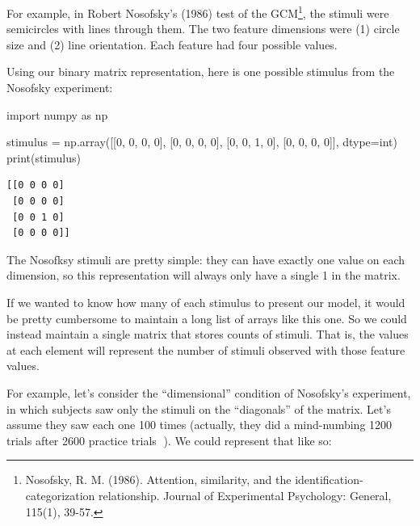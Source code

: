 \documentclass[
  letterpaper,
  DIV=11,
  numbers=noendperiod]{scrreprt}
\newenvironment{Shaded}{\begin{snugshade}}{\end{snugshade}}
\newcommand{\BuiltInTok}[1]{\textcolor[rgb]{0.00,0.23,0.31}{#1}}
\newcommand{\DecValTok}[1]{\textcolor[rgb]{0.68,0.00,0.00}{#1}}
\newcommand{\ImportTok}[1]{\textcolor[rgb]{0.00,0.46,0.62}{#1}}
\newcommand{\NormalTok}[1]{\textcolor[rgb]{0.00,0.23,0.31}{#1}}
\newcommand{\OperatorTok}[1]{\textcolor[rgb]{0.37,0.37,0.37}{#1}}
\begin{document}
For example, in Robert Nosofsky's (1986) test of the GCM\footnote{Nosofsky,
  R. M. (1986). Attention, similarity, and the
  identification-categorization relationship. Journal of Experimental
  Psychology: General, 115(1), 39-57.}, the stimuli were semicircles
with lines through them. The two feature dimensions were (1) circle size
and (2) line orientation. Each feature had four possible values.

Using our binary matrix representation, here is one possible stimulus
from the Nosofsky experiment:

\begin{Shaded}
\begin{Highlighting}[]
\ImportTok{import}\NormalTok{ numpy }\ImportTok{as}\NormalTok{ np}

\NormalTok{stimulus }\OperatorTok{=}\NormalTok{ np.array([[}\DecValTok{0}\NormalTok{, }\DecValTok{0}\NormalTok{, }\DecValTok{0}\NormalTok{, }\DecValTok{0}\NormalTok{],}
\NormalTok{                     [}\DecValTok{0}\NormalTok{, }\DecValTok{0}\NormalTok{, }\DecValTok{0}\NormalTok{, }\DecValTok{0}\NormalTok{],}
\NormalTok{                     [}\DecValTok{0}\NormalTok{, }\DecValTok{0}\NormalTok{, }\DecValTok{1}\NormalTok{, }\DecValTok{0}\NormalTok{],}
\NormalTok{                     [}\DecValTok{0}\NormalTok{, }\DecValTok{0}\NormalTok{, }\DecValTok{0}\NormalTok{, }\DecValTok{0}\NormalTok{]], dtype}\OperatorTok{=}\BuiltInTok{int}\NormalTok{)}
\BuiltInTok{print}\NormalTok{(stimulus)}
\end{Highlighting}
\end{Shaded}

\begin{verbatim}
[[0 0 0 0]
 [0 0 0 0]
 [0 0 1 0]
 [0 0 0 0]]
\end{verbatim}

The Nosofksy stimuli are pretty simple: they can have exactly one value
on each dimension, so this representation will always only have a single
1 in the matrix.

If we wanted to know how many of each stimulus to present our model, it
would be pretty cumbersome to maintain a long list of arrays like this
one. So we could instead maintain a single matrix that stores counts of
stimuli. That is, the values at each element will represent the number
of stimuli observed with those feature values.

For example, let's consider the ``dimensional'' condition of Nosofsky's
experiment, in which subjects saw only the stimuli on the ``diagonals''
of the matrix. Let's assume they saw each one 100 times (actually, they
did a mind-numbing 1200 trials after 2600 practice trials 🥴). We could
represent that like so:
\end{document}
